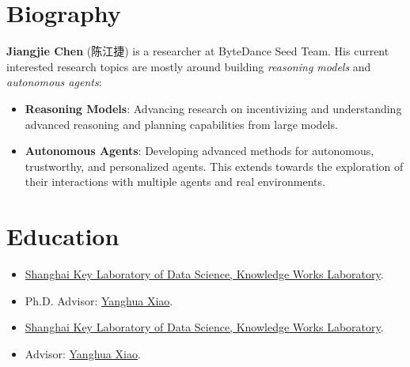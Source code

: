 \documentclass{resume}
\begin{document}





\section{Biography}

\textbf{Jiangjie Chen} (陈江捷) is a researcher at ByteDance Seed Team.
His current interested research topics are mostly around building \textit{reasoning models} and \textit{autonomous agents}:
\begin{itemize}
    \item \textbf{Reasoning Models}: Advancing research on incentivizing and understanding advanced reasoning and planning capabilities from large models.
    
    \item \textbf{Autonomous Agents}: Developing advanced methods for autonomous, trustworthy, and personalized agents. This extends towards the exploration of their interactions with multiple agents and real environments.
\end{itemize}


\section{Education}

\begin{itemize}
    \item \href{http://kw.fudan.edu.cn}{Shanghai Key Laboratory of Data Science, Knowledge Works Laboratory}.
    \item Ph.D. Advisor: \href{https://scholar.google.com/citations?user=odFW4FoAAAAJ&hl=en}{Yanghua Xiao}.
\end{itemize}



\begin{itemize}
    \item \href{http://kw.fudan.edu.cn}{Shanghai Key Laboratory of Data Science, Knowledge Works Laboratory}.
    \item Advisor: \href{https://scholar.google.com/citations?user=odFW4FoAAAAJ&hl=en}{Yanghua Xiao}.
\end{itemize}
\end{document}
